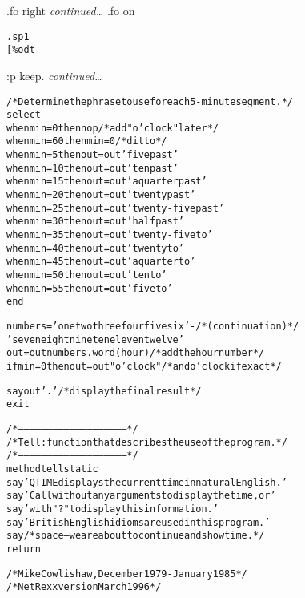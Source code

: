 .fo right
\emph{continued\ldots}
.fo on
\begin{alltt}
.sp 1
[\%odt
\end{alltt}
:p keep.
\emph{continued\ldots}
\begin{alltt}
/* Determine the phrase to use for each 5-minute segment. */
select
  when min= 0 then nop             /* add "o'clock" later */
  when min=60 then min=0                         /* ditto */
  when min= 5 then out=out 'five past'
  when min=10 then out=out 'ten past'
  when min=15 then out=out 'a quarter past'
  when min=20 then out=out 'twenty past'
  when min=25 then out=out 'twenty-five past'
  when min=30 then out=out 'half past'
  when min=35 then out=out 'twenty-five to'
  when min=40 then out=out 'twenty to'
  when min=45 then out=out 'a quarter to'
  when min=50 then out=out 'ten to'
  when min=55 then out=out 'five to'
  end

numbers='one two three four five six'-  /* (continuation) */
  'seven eight nine ten eleven twelve '
out=out numbers.word(hour)         /* add the hour number */
if min=0 then out=out "o'clock"   /* and o'clock if exact */

say out'.'                    /* display the final result */
exit

/*--------------------------------------------------------*/
/* Tell: function that describes the use of the program.  */
/*--------------------------------------------------------*/
method tell static
 say 'QTIME displays the current time in natural English.'
 say 'Call without any arguments to display the time, or'
 say 'with "?" to display this information.'
 say 'British English idioms are used in this program.'
 say /* space -- we are about to continue and show time.  */
 return

/* Mike Cowlishaw,  December 1979 - January 1985          */
/* NetRexx version March 1996                             */
\end{alltt}
